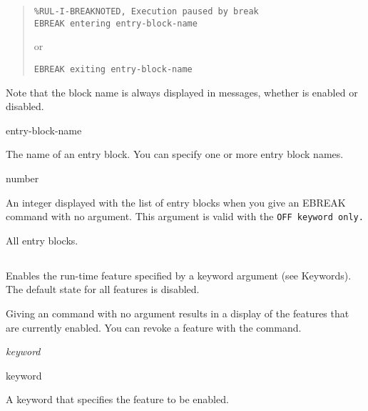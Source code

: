 \begin{quote}
\begin{verbatim}
%RUL-I-BREAKNOTED, Execution paused by break
EBREAK entering entry-block-name
\end{verbatim}
or
\begin{verbatim}
EBREAK exiting entry-block-name
\end{verbatim}
\end{quote}

Note that the block name is always displayed in  messages,
whether  is enabled or disabled.

\Format


\begin{arguments}
\item[entry-block-name] 

  The name of an entry block. You can specify one or more entry block
  names.

\item[number]

  An integer displayed with the list of entry blocks when you give an
  EBREAK command with no argument. This argument is valid with the
  \tt{OFF} keyword only.

\item[\normalfont{\co{*}}] 

  All entry blocks.
\end{arguments}

\subsection{}

Enables the run-time feature specified by a keyword argument (see
 Keywords). The default state for all features is disabled.

Giving an  command with no argument results in a display of
the features that are currently enabled. You can revoke a feature with
the  command.

\Format

 \it{keyword}

\begin{argument}

\item[keyword]

  A keyword that specifies the feature to be enabled.
\end{argument}

